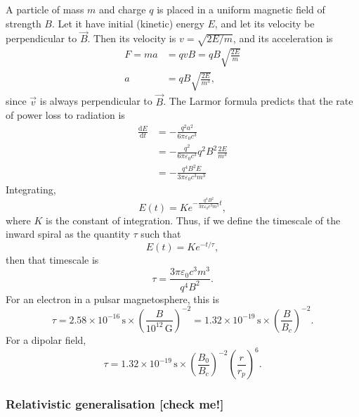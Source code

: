 \documentclass{book}
\newcommand{\deriv}[2]{\frac{\text{d}{#1}}{\text{d}{#2}}}
\begin{document}
A particle of mass $m$ and charge $q$ is placed in a uniform magnetic field of strength $B$.
Let it have initial (kinetic) energy $E$, and let its velocity be perpendicular to $\vec{B}$.
Then its velocity is $v = \sqrt{2E/m}$, and its acceleration is
\begin{equation}
\begin{aligned}
    F = ma &= qvB = qB\sqrt{\frac{2E}{m}} \\
    a &= qB\sqrt{\frac{2E}{m^3}},
\end{aligned}
\end{equation}
since $\vec{v}$ is always perpendicular to $\vec{B}$.
The Larmor formula predicts that the rate of power loss to radiation is
\begin{equation}
\begin{aligned}
    \deriv{E}{t} &= -\frac{q^2a^2}{6\pi\varepsilon_0 c^3} \\
    &= -\frac{q^2}{6\pi\varepsilon_0 c^3} q^2 B^2 \frac{2E}{m^3} \\
    &= -\frac{q^4 B^2 E}{3\pi\varepsilon_0 c^3 m^3}
\end{aligned}
\end{equation}
Integrating,
\begin{equation}
    E(t) = K e^{-\frac{q^4 B^2}{3\pi\varepsilon_0 c^3 m^3}t},
\end{equation}
where $K$ is the constant of integration. Thus, if we define the timescale of the inward spiral as the quantity $\tau$ such that
\begin{equation}
    E(t) = Ke^{-t/\tau},
\end{equation}
then that timescale is
\begin{equation}
    \tau = \frac{3\pi\varepsilon_0 c^3 m^3}{q^4 B^2}.
\end{equation}
For an electron in a pulsar magnetosphere, this is
\begin{equation}
    \tau = 2.58 \times 10^{-16}\,\text{s} \times \left(\frac{B}{10^{12}\,\text{G}}\right)^{-2}
         = 1.32 \times 10^{-19}\,\text{s} \times \left(\frac{B}{B_c}\right)^{-2}.
\end{equation}
For a dipolar field,
\begin{equation}
    \tau = 1.32 \times 10^{-19}\,\text{s} \times \left(\frac{B_0}{B_c}\right)^{-2} \left(\frac{r}{r_p}\right)^6.
\end{equation}

\subsubsection{Relativistic generalisation [check me!]}
\end{document}
